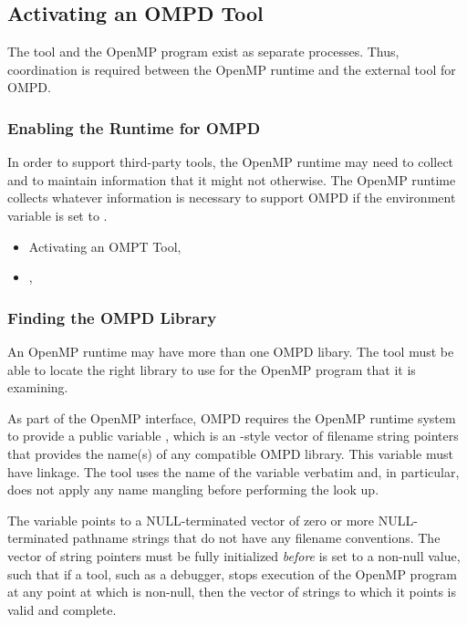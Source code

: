 \subsection{Activating an OMPD Tool}
\label{subsec:activating}

The tool and the OpenMP program exist as separate processes. 
Thus, coordination is required between the OpenMP runtime
and the external tool for OMPD.

\subsubsection{Enabling the Runtime for OMPD}
\label{subsubsec:enabling-ompd}

In order to support third-party tools, the OpenMP runtime may need to collect
and to maintain information that it might not otherwise. The OpenMP runtime 
collects whatever information is necessary to support OMPD if the environment 
variable  is set to .

\crossreferences
\begin{itemize}
\item Activating an OMPT Tool, 

\item   {}, 
\end{itemize}



\subsubsection{Finding the OMPD Library}
\label{subsubsec:finding-the-ompd}

An OpenMP runtime may have more than one OMPD libary. The tool must be able 
to locate the right library to use for the OpenMP program that it is examining.

As part of the OpenMP interface, OMPD requires the OpenMP runtime system to
provide a public variable , which is an -style
vector of filename string pointers that provides the name(s) of any compatible 
OMPD library. This variable must have  linkage. The tool uses the name 
of the variable verbatim and, in particular, does not apply any name mangling 
before performing the look up.

The  variable points to a NULL-terminated vector of 
zero or more NULL-terminated pathname strings that do not have any filename 
conventions. The vector of string pointers must be fully initialized 
\emph{before}  is set to a non-null value, such that 
if a tool, such as a debugger, stops execution of the OpenMP program at any 
point at which  is non-null, then the vector of 
strings to which it points is valid and complete.


